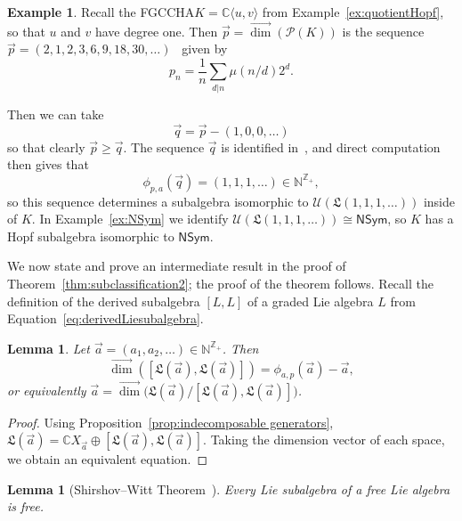 \documentclass[11pt]{amsart}
\newtheorem{lemma}[theorem]{Lemma}
\theoremstyle{definition}
\newtheorem{example}[theorem]{Example}
\numberwithin{equation}{section}
\def\NN{{\mathbb N}}
\def\CC{{\mathbb C}}
\def\ZZ{{\mathbb Z}}
\newcommand{\FGCCHA}{\textsf{FGCCHA}\xspace}
\newcommand{\vecdim}{\overrightarrow{\dim}}
\begin{document}
\begin{example}
\label{ex:NSymInCxy}
Recall the \FGCCHA $K = \CC\langle u, v \rangle$ from Example~\ref{ex:quotientHopf}, so that $u$ and $v$ have degree one.  Then $\vec{p} = \vecdim(\mathcal{P}(K))$ is the sequence
$\vec{p} = (2, 1, 2, 3, 6, 9, 18, 30,\ldots)$~\cite[\href{https://oeis.org/A001037}{A001037}]{OEIS} given by 
\[
p_{n} = \frac{1}{n} \sum_{d | n} \mu(n/d) 2^{d}.
\]

Then we can take 
\[
\vec{q} = \vec{p} - (1, 0, 0, \ldots)
\]
so that clearly $\vec{p} \ge \vec{q}$.  
The sequence $\vec{q}$ is identified in~\cite[\href{https://oeis.org/A059966}{A059966}]{OEIS}, and direct computation then gives that
\[
\phi_{p, a}(\vec{q}) = (1, 1, 1, \ldots) \in \NN^{\ZZ_{+}},
\]
so this sequence determines a subalgebra isomorphic to $\mathcal{U}(\mathfrak{L}(1, 1, 1, \ldots))$ inside of $K$.   
In Example~\ref{ex:NSym} we identify $\mathcal{U}(\mathfrak{L}(1, 1, 1, \ldots)) \cong \mathsf{NSym}$, so $K$ has a Hopf subalgebra isomorphic to $\mathsf{NSym}$.
\end{example}

We now state and prove an intermediate result in the proof of Theorem~\ref{thm:subclassification2}; the proof of the theorem follows.  Recall the definition of the derived subalgebra $[L, L]$ of a graded Lie algebra $L$ from Equation~\eqref{eq:derivedLiesubalgebra}.

\begin{lemma}
\label{lem:deriveddimension}
Let $\vec{a} = (a_{1}, a_{2}, \ldots) \in \NN^{\ZZ_{+}}$.  Then
\[
\vecdim([\mathfrak{L}(\vec{a}), \mathfrak{L}(\vec{a})]) = \phi_{a, p}(\vec{a}) - \vec{a},
\]
or equivalently $\vec{a} = \vecdim\big(\mathfrak{L}(\vec{a})\big/ [\mathfrak{L}(\vec{a}), \mathfrak{L}(\vec{a})]\big)$.
\end{lemma}
\begin{proof}
Using Proposition~\ref{prop:indecomposable generators}, $ \mathfrak{L}(\vec{a}) = \CC X_{\vec{a}} \oplus [\mathfrak{L}(\vec{a}), \mathfrak{L}(\vec{a})]$.  Taking the dimension vector of each space, we obtain an equivalent equation.
\end{proof}

\begin{lemma}[Shirshov--Witt Theorem~\cite{}]
\label{lem:ShiWitt}
Every Lie subalgebra of a free Lie algebra is free.
\end{lemma}
\end{document}
